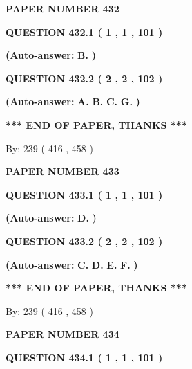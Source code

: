 \documentclass[12pt]{article}
\begin{document}
   
   
   
\newpage 
\setcounter{page}{ 
   432001 } 
   
   
 {\textbf{ \Large{ PAPER NUMBER  432  }}}
   
   
  
  
{\textbf{\large{QUESTION
432.1 
 ( 1 , 1 , 101 )
}}}
 
 
{\textbf{(Auto-answer:}}
{\textbf{\large{
B.}}}
{\textbf{)}}
 
 
  
  
{\textbf{\large{QUESTION
432.2 
 ( 2 , 2 , 102 )
}}}
 
 
{\textbf{(Auto-answer:}}
{\textbf{\large{
A.}}}
{\textbf{\large{
B.}}}
{\textbf{\large{
C.}}}
{\textbf{\large{
G.}}}
{\textbf{)}}
 
 
   
   
\vspace{1.0in} 
{\textbf{\large{ *** END OF PAPER, THANKS *** }}} 
   
   
\hspace{1.0in} By: 
 239 ( 416 ,  458 )
   
   
   
   
\newpage 
\setcounter{page}{ 
   433001 } 
   
   
 {\textbf{ \Large{ PAPER NUMBER  433  }}}
   
   
  
  
{\textbf{\large{QUESTION
433.1 
 ( 1 , 1 , 101 )
}}}
 
 
{\textbf{(Auto-answer:}}
{\textbf{\large{
D.}}}
{\textbf{)}}
 
 
  
  
{\textbf{\large{QUESTION
433.2 
 ( 2 , 2 , 102 )
}}}
 
 
{\textbf{(Auto-answer:}}
{\textbf{\large{
C.}}}
{\textbf{\large{
D.}}}
{\textbf{\large{
E.}}}
{\textbf{\large{
F.}}}
{\textbf{)}}
 
 
   
   
\vspace{1.0in} 
{\textbf{\large{ *** END OF PAPER, THANKS *** }}} 
   
   
\hspace{1.0in} By: 
 239 ( 416 ,  458 )
   
   
   
   
\newpage 
\setcounter{page}{ 
   434001 } 
   
   
 {\textbf{ \Large{ PAPER NUMBER  434  }}}
   
   
  
  
{\textbf{\large{QUESTION
434.1 
 ( 1 , 1 , 101 )
}}}
 
\end{document}
